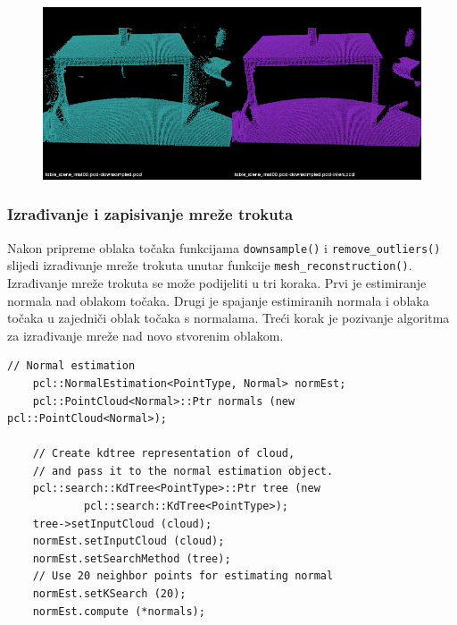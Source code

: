 \begin{figure}[h]
\centering
\includegraphics[scale=0.5]{figures/tablescene-remove-outliers-example.png}
\caption{}
\label{fig:{tablescene-remove-outliers-example.png}}
\end{figure}


\subsubsection{Izrađivanje i zapisivanje mreže trokuta} %
\label{ssub:Izradivanje i zapisivanje mreže trokuta}

Nakon pripreme oblaka točaka funkcijama \texttt{downsample()} i
\texttt{remove\_outliers()} slijedi izrađivanje mreže trokuta unutar
funkcije \texttt{mesh\_reconstruction()}. Izrađivanje mreže trokuta se
može podijeliti u tri koraka. Prvi je estimiranje normala nad oblakom
točaka. Drugi je spajanje estimiranih normala i oblaka točaka u
zajedniči oblak točaka s normalama. Treći korak je pozivanje algoritma
za izrađivanje mreže nad novo stvorenim oblakom.

\begin{lstlisting}[label=lstIzradivanje1, caption={Dio izvornog koda iz
funkcije \texttt{reconstruct\_mesh()} }]
    // Normal estimation
    pcl::NormalEstimation<PointType, Normal> normEst;
    pcl::PointCloud<Normal>::Ptr normals (new pcl::PointCloud<Normal>);
    
    // Create kdtree representation of cloud, 
    // and pass it to the normal estimation object. 
    pcl::search::KdTree<PointType>::Ptr tree (new
            pcl::search::KdTree<PointType>);
    tree->setInputCloud (cloud);
    normEst.setInputCloud (cloud);
    normEst.setSearchMethod (tree);
    // Use 20 neighbor points for estimating normal
    normEst.setKSearch (20);
    normEst.compute (*normals);
\end{lstlisting}

